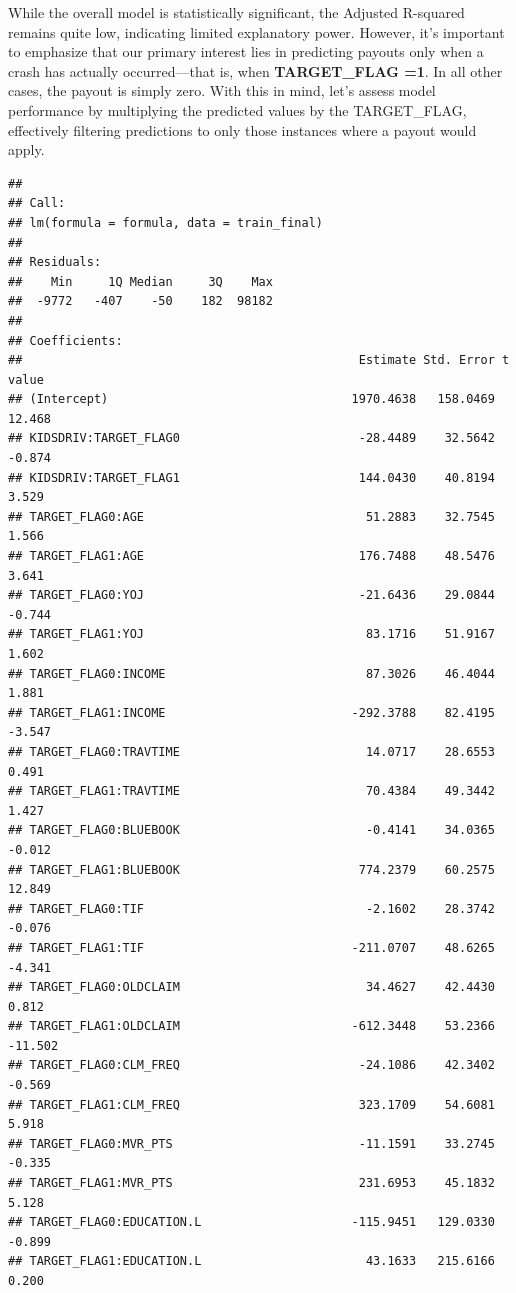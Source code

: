 \documentclass[
]{article}
\begin{document}
While the overall model is statistically significant, the Adjusted
R-squared remains quite low, indicating limited explanatory power.
However, it's important to emphasize that our primary interest lies in
predicting payouts only when a crash has actually occurred---that is,
when \textbf{TARGET\_FLAG =1}. In all other cases, the payout is simply
zero. With this in mind, let's assess model performance by multiplying
the predicted values by the TARGET\_FLAG, effectively filtering
predictions to only those instances where a payout would apply.

\begin{verbatim}
## 
## Call:
## lm(formula = formula, data = train_final)
## 
## Residuals:
##    Min     1Q Median     3Q    Max 
##  -9772   -407    -50    182  98182 
## 
## Coefficients:
##                                               Estimate Std. Error t value
## (Intercept)                                  1970.4638   158.0469  12.468
## KIDSDRIV:TARGET_FLAG0                         -28.4489    32.5642  -0.874
## KIDSDRIV:TARGET_FLAG1                         144.0430    40.8194   3.529
## TARGET_FLAG0:AGE                               51.2883    32.7545   1.566
## TARGET_FLAG1:AGE                              176.7488    48.5476   3.641
## TARGET_FLAG0:YOJ                              -21.6436    29.0844  -0.744
## TARGET_FLAG1:YOJ                               83.1716    51.9167   1.602
## TARGET_FLAG0:INCOME                            87.3026    46.4044   1.881
## TARGET_FLAG1:INCOME                          -292.3788    82.4195  -3.547
## TARGET_FLAG0:TRAVTIME                          14.0717    28.6553   0.491
## TARGET_FLAG1:TRAVTIME                          70.4384    49.3442   1.427
## TARGET_FLAG0:BLUEBOOK                          -0.4141    34.0365  -0.012
## TARGET_FLAG1:BLUEBOOK                         774.2379    60.2575  12.849
## TARGET_FLAG0:TIF                               -2.1602    28.3742  -0.076
## TARGET_FLAG1:TIF                             -211.0707    48.6265  -4.341
## TARGET_FLAG0:OLDCLAIM                          34.4627    42.4430   0.812
## TARGET_FLAG1:OLDCLAIM                        -612.3448    53.2366 -11.502
## TARGET_FLAG0:CLM_FREQ                         -24.1086    42.3402  -0.569
## TARGET_FLAG1:CLM_FREQ                         323.1709    54.6081   5.918
## TARGET_FLAG0:MVR_PTS                          -11.1591    33.2745  -0.335
## TARGET_FLAG1:MVR_PTS                          231.6953    45.1832   5.128
## TARGET_FLAG0:EDUCATION.L                     -115.9451   129.0330  -0.899
## TARGET_FLAG1:EDUCATION.L                       43.1633   215.6166   0.200

\end{verbatim}
\end{document}
